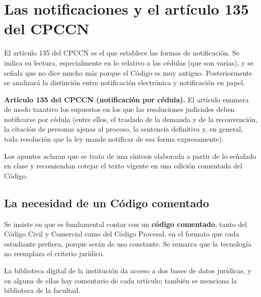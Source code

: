 \documentclass[12pt,oneside]{book}
\begin{document}
\section{Las notificaciones y el art\'iculo 135 del CPCCN}

El art\'iculo 135 del CPCCN es el que establece las formas de notificaci\'on. Se indica su lectura, especialmente en lo relativo a las c\'edulas (que son varias), y se se\~nala que no dice mucho m\'as porque el C\'odigo es muy antiguo. Posteriormente se analizar\'a la distinci\'on entre notificaci\'on electr\'onica y notificaci\'on en papel.

\begin{important}
\textbf{Art\'iculo 135 del CPCCN (notificaci\'on por c\'edula).} El art\'iculo enumera de modo taxativo los supuestos en los que las resoluciones judiciales deben notificarse por c\'edula (entre ellos, el traslado de la demanda y de la reconvenci\'on, la citaci\'on de personas ajenas al proceso, la sentencia definitiva y, en general, toda resoluci\'on que la ley mande notificar de esa forma expresamente).

Los apuntes aclaran que se trata de una s\'intesis elaborada a partir de lo se\~nalado en clase y recomiendan cotejar el texto vigente en una edici\'on comentada del C\'odigo.
\end{important}

\subsection{La necesidad de un C\'odigo comentado}

Se insiste en que es fundamental contar con un \textbf{c\'odigo comentado}, tanto del C\'odigo Civil y Comercial como del C\'odigo Procesal, en el formato que cada estudiante prefiera, porque ser\'an de uso constante. Se remarca que la tecnolog\'ia no reemplaza el criterio jur\'idico.

\begin{note}
La biblioteca digital de la instituci\'on da acceso a dos bases de datos jur\'idicas, y en alguna de ellas hay comentario de cada art\'iculo; tambi\'en se menciona la biblioteca de la facultad. %
\end{note}
\end{document}
